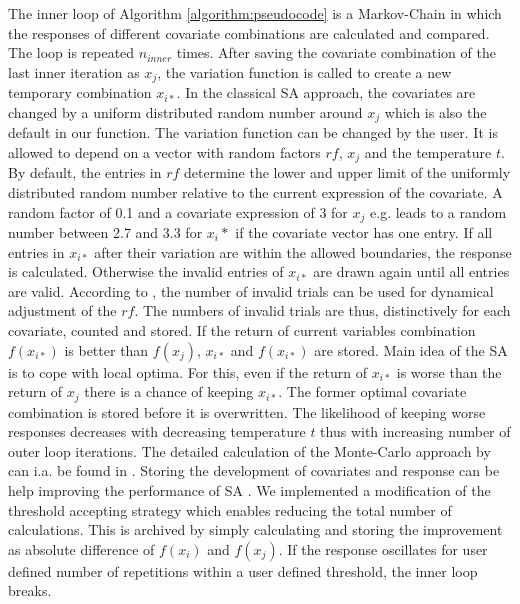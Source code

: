 The inner loop of Algorithm \ref{algorithm:pseudocode} is a Markov-Chain in which the responses of different covariate combinations are calculated and compared. The loop is repeated $n_{inner}$ times. After saving the covariate combination of the last inner iteration as $x_j$, the variation function is called to create a new temporary combination $x_{i*}$. In the classical SA approach, the covariates are changed by a uniform distributed random number around $x_j$ \citep{kirkpatrick_1983} which is also the default in our function. The variation function can be changed by the user. It is allowed to depend on a vector with random factors $rf$, $x_j$ and the temperature $t$. By default, the entries in $rf$ determine the lower and upper limit of the uniformly distributed random number relative to the current expression of the covariate. A random factor of 0.1 and a covariate expression of 3 for $x_j$ e.g. leads to a random number between 2.7 and 3.3 for $x_i*$ if the covariate vector has one entry. If all entries in $x_{i*}$ after their variation are within the allowed boundaries, the response is calculated. Otherwise the invalid entries of $x_{i*}$ are drawn again until all entries are valid. According to \citet{corana_1987}, the number of invalid trials can be used for dynamical adjustment of the $rf$. The numbers of invalid trials are thus, distinctively for each covariate, counted and stored. If the return of current variables combination $f(x_{i*})$ is better than $f(x_j)$, $x_{i*}$ and $f(x_{i*})$ are stored. Main idea of the SA is to cope with local optima. For this, even if the return of $x_{i*}$ is worse than the return of $x_{j}$ there is a chance of keeping  $x_{i*}$. The former optimal covariate combination is stored before it is overwritten. The likelihood of keeping worse responses decreases with decreasing temperature $t$ thus with increasing number of outer loop iterations. The detailed calculation of the Monte-Carlo approach by \citet{metropolis_1953} can i.a. be found in \citet{kirkpatrick_1983}. Storing the development of covariates and response can be help improving the performance of SA \citep{lin_1995, hansen_2012}. We implemented a modification of the threshold accepting strategy \citep{dueck_1990} which enables reducing the total number of calculations. This is archived by simply calculating and storing the improvement as absolute difference of $f(x_{i})$ and $f(x_j)$. If the response oscillates for user defined number of repetitions within a user defined threshold, the inner loop breaks.\\

